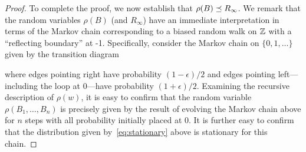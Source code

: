 \begin{proof}
  To complete the proof, we now establish that
  $\rho(B) \preceq R_\infty$.  We remark that the random variables
  $\rho(B)$ (and $R_\infty$) have an immediate interpretation in terms
  of the Markov chain corresponding to a biased random walk on $\mathbb{Z}$
  with a ``reflecting boundary'' at -1. Specifically, consider the
  Markov chain on $\{0, 1, \ldots\}$ given by the transition diagram
  \begin{center}
  \end{center}
  where edges pointing right have probability $(1-\epsilon)/2$ and edges pointing left---including the loop at 0---have probability $(1+\epsilon)/2$. Examining the recursive description of $\rho(w)$, it is easy to confirm that the random variable $\rho(B_1, \ldots, B_n)$ is precisely given by the result of evolving the Markov chain above for $n$ steps with all probability initially placed at 0. It is further easy to confirm that the distribution given by~\eqref{eq:stationary} above is stationary for this chain.



\end{proof}
